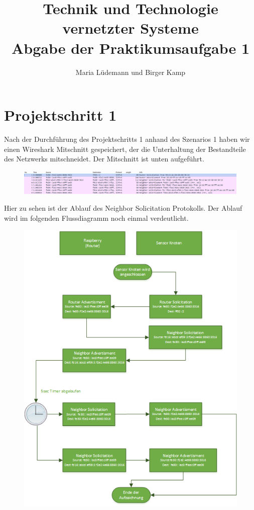 \documentclass[]{scrartcl}
\title{Technik und Technologie vernetzter Systeme  \\ Abgabe der Praktikumsaufgabe 1}
\author{Maria Lüdemann und Birger Kamp}
\begin{document}
\maketitle

\section{Projektschritt 1}
Nach der Durchführung des Projektschritts 1 anhand des Szenarios 1 haben wir einen Wireshark Mitschnitt gespeichert, der die Unterhaltung der Bestandteile des Netzwerks mitschneidet. Der Mitschnitt ist unten aufgeführt.

\begin{figure}[H]
	\centering
	\includegraphics[width=1\linewidth]{wireshark_1.png}
	\label{fig:wireshark_1}
\end{figure}

Hier zu sehen ist der Ablauf des Neighbor Solicitation Protokolls. Der Ablauf wird im folgenden Flussdiagramm noch einmal verdeutlicht. 


\begin{figure}[H]
	\centering
	\includegraphics[width=1\linewidth]{flussdiagramm.png}
	\label{fig:flussdiagramm}
\end{figure}
\end{document}
